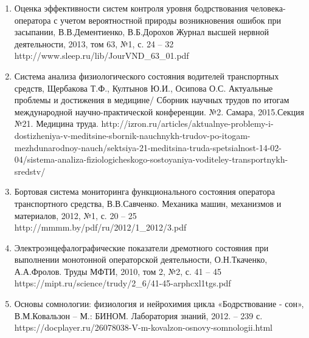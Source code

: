 \begin{enumerate}
    \item Оценка эффективности систем контроля уровня бодрствования человека-оператора с учетом вероятностной природы возникновения ошибок при засыпании, В.В.Дементиенко, В.Б.Дорохов
    Журнал высшей нервной деятельности, 2013, том 63, №1, с. 24 – 32
    http://www.sleep.ru/lib/JourVND_63_01.pdf 
    \item Система анализа физиологического состояния водителей транспортных средств, Щербакова Т.Ф., Култынов Ю.И., Осипова О.С. Актуальные проблемы и достижения в медицине/ Сборник научных трудов по итогам международной научно-практической конференции. №2. Самара, 2015.Секция №21. Медицина труда.
    http://izron.ru/articles/aktualnye-problemy-i-dostizheniya-v-meditsine-sbornik-nauchnykh-trudov-po-itogam-mezhdunarodnoy-nauch/sektsiya-21-meditsina-truda-spetsialnost-14-02-04/sistema-analiza-fiziologicheskogo-sostoyaniya-voditeley-transportnykh-sredstv/ 
    \item Бортовая система мониторинга функционального состояния оператора транспортного средства, В.В.Савченко. Механика машин, механизмов и материалов, 2012, №1,  с. 20 – 25
    http://mmmm.by/pdf/ru/2012/1_2012/3.pdf 
    \item Электроэнцефалографические показатели дремотного состояния при выполнении монотонной операторской деятельности, О.Н.Ткаченко, А.А.Фролов. Труды МФТИ, 2010, том 2, №2, с. 41 – 45
    https://mipt.ru/science/trudy/2_6/41-45-arphcxl1tgs.pdf 
    \item Основы сомнологии: физиология и нейрохимия цикла «Бодрствование - сон», В.М.Ковальзон – М.: БИНОМ. Лаборатория знаний, 2012. – 239 с.
    https://docplayer.ru/26078038-V-m-kovalzon-osnovy-somnologii.html  
\end{enumerate}